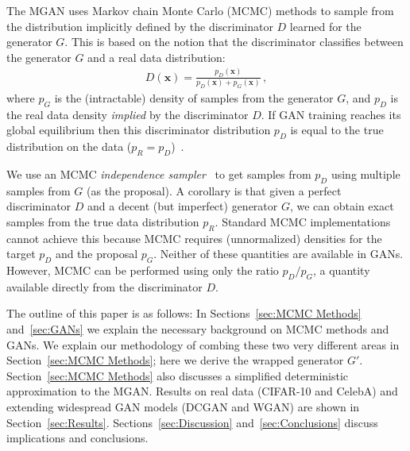 \documentclass{article}
\renewcommand{\vec}[1]{{\boldsymbol{\mathbf{#1}}}} %
\newcommand{\PG}{{p_G}}
\newcommand{\PD}{{p_D}}
\newcommand{\PR}{{p_R}}
\begin{document}
The MGAN uses Markov chain Monte Carlo (MCMC) methods to sample from the distribution implicitly defined by the discriminator $D$ learned for the generator $G$.
This is based on the notion that the discriminator classifies between the generator $G$ and a real data distribution:
\begin{align}
  D(\vec x) = \frac{\PD(\vec x)}{\PD(\vec x) + \PG(\vec x)}\,,
\end{align}
where $\PG$ is the (intractable) density of samples from the generator $G$, and $\PD$ is the real data density \emph{implied} by the discriminator $D$.
If GAN training reaches its global equilibrium then this discriminator distribution $\PD$ is equal to the true distribution on the data ($\PR = \PD$)~\citep{Goodfellow2014}.

We use an MCMC \emph{independence sampler}~\citep{Tierney1994} to get samples from $\PD$ using multiple samples from $G$ (as the proposal)\@.
A corollary is that given a perfect discriminator $D$ and a decent (but imperfect) generator $G$, we can obtain exact samples from the true data distribution $\PR$.
Standard MCMC implementations cannot achieve this because MCMC requires (unnormalized) densities for the target $\PD$ and the proposal $\PG$.
Neither of these quantities are available in GANs.
However, MCMC can be performed using only the ratio $\PD / \PG$, a quantity available directly from the discriminator $D$.


The outline of this paper is as follows:
In Sections~\ref{sec:MCMC Methods} and~\ref{sec:GANs} we explain the necessary background on MCMC methods and GANs.
We explain our methodology of combing these two very different areas in Section~\ref{sec:MCMC Methods}; here we derive the wrapped generator $G'$.
Section~\ref{sec:MCMC Methods} also discusses a simplified deterministic approximation to the MGAN\@.
Results on real data (CIFAR-10 and CelebA) and extending widespread GAN models (DCGAN and WGAN) are shown in Section~\ref{sec:Results}.
Sections~\ref{sec:Discussion} and~\ref{sec:Conclusions} discuss implications and conclusions.
\end{document}
